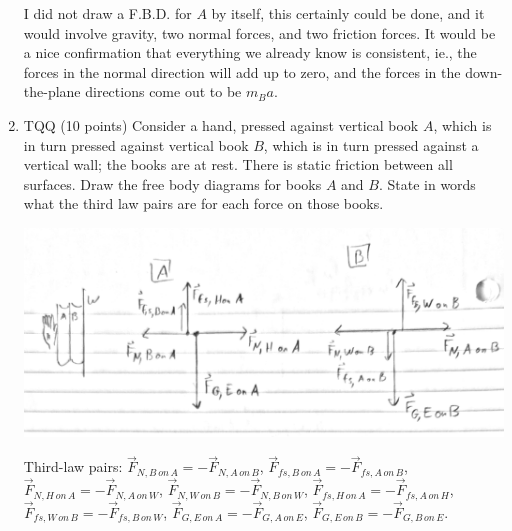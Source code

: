 \documentclass[12pt]{article}
\begin{document}
\begin{enumerate}
{I did not draw a F.B.D. for $A$ by itself, this certainly could be done, and it would involve gravity, two normal forces, and two friction forces. It would be a nice confirmation that everything we already know is consistent, ie., the forces in the normal direction will add up to zero, and the forces in the down-the-plane directions come out to be $m_B a$.

}



\item	TQQ (10 points) Consider a hand, pressed against vertical book $A$, which is in turn pressed against vertical book $B$, which is in turn pressed against a vertical wall; the books are at rest.  There is static friction between all surfaces.  Draw the free body diagrams for books $A$ and $B$.  State in words what the third law pairs are for each force on those books.

\centerline{\includegraphics[width=.8\textwidth]{fbd3.png}}

Third-law pairs: $\vec F_{N,B\,on\,A} = -\vec F_{N,A\,on\,B}$, $\vec F_{fs,B\,on\,A} = -\vec F_{fs,A\,on\,B}$, $\vec F_{N,H\,on\,A} = -\vec F_{N,A\,on\,W}$, $\vec F_{N,W\,on\,B} = -\vec F_{N,B\,on\,W}$, $\vec F_{fs,H\,on\,A} = -\vec F_{fs,A\,on\,H}$, $\vec F_{fs,W\,on\,B} = -\vec F_{fs,B\,on\,W}$, $\vec F_{G,E\,on\,A} = -\vec F_{G,A\,on\,E}$, $\vec F_{G,E\,on\,B} = -\vec F_{G,B\,on\,E}$.


\end{enumerate}
\end{document}
